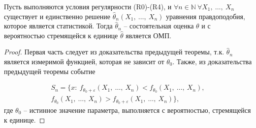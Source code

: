 \begin{corollary}
    Пусть выполняются условия регулярности (R0)-(R4), и $\displaystyle \forall n\in \mathbb{N} \ \forall X_{1} ,\ \dotsc ,\ X_{n}$ существует и единственно решение $\displaystyle \hat{\theta }_{n}( X_{1} ,\ \dotsc ,\ X_{n})$ уравнения правдоподобия, которое является статистикой. Тогда $\displaystyle \hat{\theta }_{n}$ -- состоятельная оценка $\displaystyle \theta $ и с вероятностью стремящейся к единице $\displaystyle \hat{\theta }$ является ОМП.
\end{corollary}
\begin{proof}
    Первая часть следует из доказательства предыдущей теоремы, т.к. $\displaystyle \hat{\theta }_{n}$ является измеримой функцией, которая не зависит от $\displaystyle \theta _{0}$. Также, из доказательства предыдущей теоремы событие
    
    
    \begin{gather*}
    S_{n} =\{x:\ f_{\theta _{0} +\varepsilon }( X_{1} ,\ \dotsc ,\ X_{n}) < f_{\theta _{0}}( X_{1} ,\ \dotsc ,\ X_{n}) ,\\
    f_{\theta _{0}}( X_{1} ,\ \dotsc ,\ X_{n})  >f_{\theta _{0} +\varepsilon }( X_{1} ,\ \dotsc ,\ X_{n})\} ,
    \end{gather*}
    где $\displaystyle \theta _{0}$ -- истинное значение параметра, выполняется с вероятностью, стремящейся к единице.
    
    
    
    
    
    
    
\end{proof}
